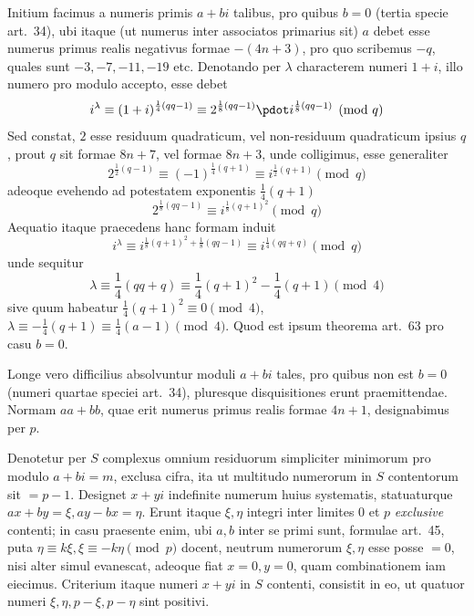 Initium facimus a numeris primis $a+bi$ talibus, pro quibus $b=0$ (tertia specie art.~34), ubi itaque (ut numerus inter associatos primarius sit) $a$ debet esse numerus primus realis negativus formae $-(4n+3)$, pro quo scribemus $-q$, quales sunt $-3,-7,-11,-19$ etc. Denotando per $\lambda$ characterem numeri $1+i$, illo numero pro modulo accepto, esse debet
\[
i^\lambda\equiv(1+i)^{\frac14(qq-1)}\equiv2^{\frac18(qq-1)}\pdot i^{\frac18(qq-1)}\pmod q
\]
Sed constat, $2$ esse residuum quadraticum, vel non-residuum quadraticum ipsius $q$, prout $q$ sit formae $8n+7$, vel formae $8n+3$, unde colligimus, esse generaliter
\[
2^{\frac12(q-1)}\equiv(-1)^{\frac14(q+1)}\equiv i^{\frac12(q+1)}\pmod q
\]
adeoque evehendo ad potestatem exponentis $\frac14(q+1)$
\[
2^{\frac18(qq-1)}\equiv i^{\frac18(q+1)^2}\pmod q
\]
Aequatio itaque praecedens hanc formam induit
\[
i^\lambda\equiv i^{\frac18(q+1)^2+\frac18(qq-1)}\equiv i^{\frac14(qq+q)}\pmod q
\]
unde sequitur
\[
\lambda\equiv\frac14(qq+q)\equiv\frac14(q+1)^2-\frac14(q+1)\pmod4
\]
sive quum habeatur $\frac14(q+1)^2\equiv0\pmod4$, $\lambda\equiv-\frac14(q+1)\equiv\frac14(a-1)\pmod4$. Quod est ipsum theorema art.~63 pro casu $b=0$.

%
Longe vero difficilius absolvuntur moduli $a+bi$ tales, pro quibus non est $b=0$ (numeri quartae speciei art.~34), pluresque disquisitiones erunt praemittendae. Normam $aa+bb$, quae erit numerus primus realis formae $4n+1$, designabimus per $p$.

Denotetur per $S$ complexus omnium residuorum simpliciter minimorum pro modulo $a+bi=m$, exclusa cifra, ita ut multitudo numerorum in $S$ contentorum sit $=p-1$. Designet $x+yi$ indefinite numerum huius systematis, statuaturque $ax+by=\xi,ay-bx=\eta$. Erunt itaque $\xi,\eta$ integri inter limites $0$ et $p$ \emph{exclusive} contenti; in casu praesente enim, ubi $a,b$ inter se primi sunt, formulae art.~45, puta $\eta\equiv k\xi,\xi\equiv-k\eta\pmod p$ docent, neutrum numerorum $\xi,\eta$ esse posse $=0$, nisi alter simul evanescat, adeoque fiat $x=0,y=0$, quam combinationem iam eiecimus. Criterium itaque numeri $x+yi$ in $S$ contenti, consistit in eo, ut quatuor numeri $\xi,\eta,p-\xi,p-\eta$ sint positivi.

